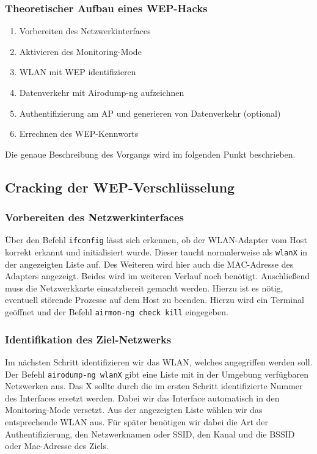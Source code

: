 \subsubsection{Theoretischer Aufbau eines WEP-Hacks}
\begin{enumerate}
	\item Vorbereiten des Netzwerkinterfaces
	\item Aktivieren des Monitoring-Mode
	\item WLAN mit WEP identifizieren
	\item Datenverkehr mit Airodump-ng aufzeichnen
	\item Authentifizierung am AP und generieren von Datenverkehr (optional)
	\item Errechnen des WEP-Kennworts
\end{enumerate}
Die genaue Beschreibung des Vorgangs wird im folgenden Punkt beschrieben.

\subsection{Cracking der WEP-Verschlüsselung}

	\subsubsection{Vorbereiten des Netzwerkinterfaces}
	Über den Befehl \colorbox{altgray}{\lstinline|ifconfig|} lässt sich erkennen, ob der WLAN-Adapter vom Host korrekt erkannt und initialisiert wurde. Dieser taucht normalerweise als \colorbox{altgray}{\lstinline|wlanX|} in der angezeigten Liste auf. Des Weiteren wird hier auch die MAC-Adresse des Adapters angezeigt. Beides wird im weiteren Verlauf noch benötigt.
	Anschließend muss die Netzwerkkarte einsatzbereit gemacht werden. Hierzu ist es nötig, eventuell
	störende Prozesse auf dem Host zu beenden. Hierzu wird ein Terminal geöffnet und der
	Befehl \colorbox{altgray}{\lstinline|airmon-ng check kill|} eingegeben.

	\subsubsection{Identifikation des Ziel-Netzwerks}
	Im nächsten Schritt identifizieren wir das WLAN, welches angegriffen werden soll. Der Befehl \colorbox{altgray}{\lstinline|airodump-ng wlanX|} gibt eine Liste mit in der Umgebung verfügbaren Netzwerken aus. Das X sollte durch die im ersten Schritt identifizierte Nummer des Interfaces ersetzt werden.
	Dabei wir das Interface automatisch in den Monitoring-Mode versetzt. Aus der angezeigten Liste wählen wir das entsprechende WLAN aus. Für später benötigen
	wir dabei die Art der Authentifizierung, den Netzwerknamen oder SSID, den Kanal und die BSSID oder Mac-Adresse des
	Ziels.

